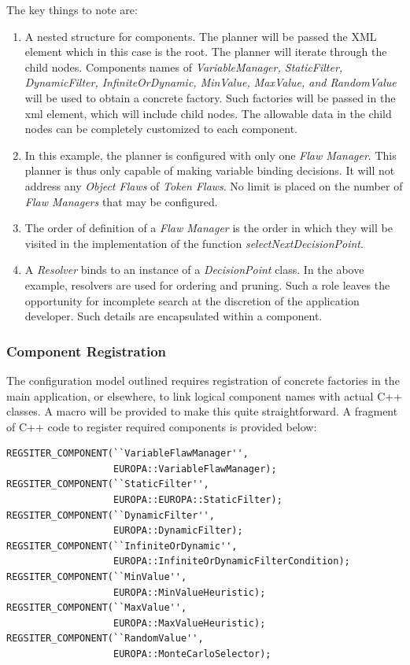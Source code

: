 \documentclass[10pt, letterpaper, oneside]{article}
\begin{document}
The key things to note are:
\begin{enumerate}
\item A nested structure for components. The planner will be passed the XML element which in this case is the root. The planner will iterate through the child nodes. Components names of {\em VariableManager, StaticFilter, DynamicFilter, InfiniteOrDynamic, MinValue, MaxValue, and RandomValue} will be used to obtain a concrete factory. Such factories will be passed in the xml element, which will include child nodes. The allowable data in the child nodes can be completely customized to each component.
\item In this example, the planner is configured with only one {\em Flaw Manager}. This planner is thus only capable of making variable binding decisions. It will not address any {\em Object Flaws} of {\em Token Flaws}. No limit is placed on the number of {\em Flaw Managers} that may be configured.
\item The order of definition of a {\em Flaw Manager} is the order in which they will be visited in the implementation of the function {\em selectNextDecisionPoint}.
\item A {\em Resolver} binds to an instance of a {\em DecisionPoint} class. In the above example, resolvers are used for ordering and pruning. Such a role leaves the opportunity for incomplete search at the discretion of the application developer. Such details are encapsulated within a component.
\end{enumerate}

\subsubsection{Component Registration}
The configuration model outlined requires registration of concrete factories in the main application, or elsewhere, to link logical component names with actual C++ classes. A macro will be provided to make this quite straightforward. A fragment of C++ code to register required components is provided below:

\begin{verbatim}
REGSITER_COMPONENT(``VariableFlawManager'', 
                   EUROPA::VariableFlawManager);
REGSITER_COMPONENT(``StaticFilter'', 
                   EUROPA::EUROPA::StaticFilter);
REGSITER_COMPONENT(``DynamicFilter'', 
                   EUROPA::DynamicFilter);
REGSITER_COMPONENT(``InfiniteOrDynamic'', 
                   EUROPA::InfiniteOrDynamicFilterCondition);
REGSITER_COMPONENT(``MinValue'', 
                   EUROPA::MinValueHeuristic);
REGSITER_COMPONENT(``MaxValue'', 
                   EUROPA::MaxValueHeuristic);
REGSITER_COMPONENT(``RandomValue'', 
                   EUROPA::MonteCarloSelector);
\end{verbatim}
\end{document}
